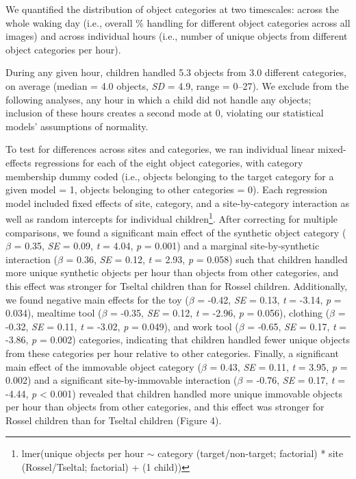 \documentclass[10pt, letterpaper]{article}
\begin{document}
We quantified the distribution of object categories at two timescales:
across the whole waking day (i.e., overall \% handling for different
object categories across all images) and across individual hours (i.e.,
number of unique objects from different object categories per hour).

During any given hour, children handled 5.3 objects from 3.0 different
categories, on average (median = 4.0 objects, \emph{SD} = 4.9, range =
0--27). We exclude from the following analyses, any hour in which a
child did not handle any objects; inclusion of these hours creates a
second mode at 0, violating our statistical models' assumptions of
normality.

To test for differences across sites and categories, we ran individual
linear mixed-effects regressions for each of the eight object
categories, with category membership dummy coded (i.e., objects
belonging to the target category for a given model = 1, objects
belonging to other categories = 0). Each regression model included fixed
effects of site, category, and a site-by-category interaction as well as
random intercepts for individual children\footnote{lmer(unique objects
  per hour \({\sim}\) category (target/non-target; factorial) * site
  (Rossel/Tseltal; factorial) + (1 \textbar{} child))}. After correcting
for multiple comparisons, we found a significant main effect of the
synthetic object category (\(\beta\) = 0.35, \emph{SE} = 0.09, \emph{t}
= 4.04, \emph{p} = 0.001) and a marginal site-by-synthetic interaction
(\(\beta\) = 0.36, \emph{SE} = 0.12, \emph{t} = 2.93, \emph{p} = 0.058)
such that children handled more unique synthetic objects per hour than
objects from other categories, and this effect was stronger for Tseltal
children than for Rossel children. Additionally, we found negative main
effects for the toy (\(\beta\) = -0.42, \emph{SE} = 0.13, \emph{t} =
-3.14, \emph{p} = 0.034), mealtime tool (\(\beta\) = -0.35, \emph{SE} =
0.12, \emph{t} = -2.96, \emph{p} = 0.056), clothing (\(\beta\) = -0.32,
\emph{SE} = 0.11, \emph{t} = -3.02, \emph{p} = 0.049), and work tool
(\(\beta\) = -0.65, \emph{SE} = 0.17, \emph{t} = -3.86, \emph{p} =
0.002) categories, indicating that children handled fewer unique objects
from these categories per hour relative to other categories. Finally, a
significant main effect of the immovable object category (\(\beta\) =
0.43, \emph{SE} = 0.11, \emph{t} = 3.95, \emph{p} = 0.002) and a
significant site-by-immovable interaction (\(\beta\) = -0.76, \emph{SE}
= 0.17, \emph{t} = -4.44, \emph{p} \textless{} 0.001) revealed that
children handled more unique immovable objects per hour than objects
from other categories, and this effect was stronger for Rossel children
than for Tseltal children (Figure 4).
\end{document}
